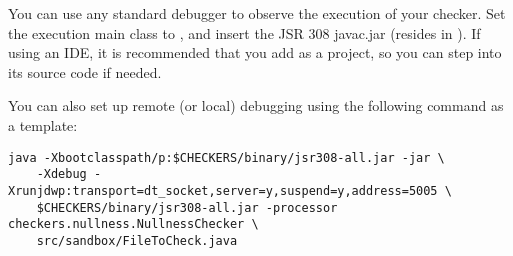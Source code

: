 You can use any standard debugger to observe the execution of your checker.
Set the execution main class to , and insert
the JSR 308 javac.jar (resides in
).  If using an IDE, it is
recommended that you add  as a project, so you
can step into its source code if needed.

You can also set up remote (or local) debugging using the following command as a template:

\begin{Verbatim}
java -Xbootclasspath/p:$CHECKERS/binary/jsr308-all.jar -jar \
    -Xdebug -Xrunjdwp:transport=dt_socket,server=y,suspend=y,address=5005 \
    $CHECKERS/binary/jsr308-all.jar -processor checkers.nullness.NullnessChecker \
    src/sandbox/FileToCheck.java

\end{Verbatim}



